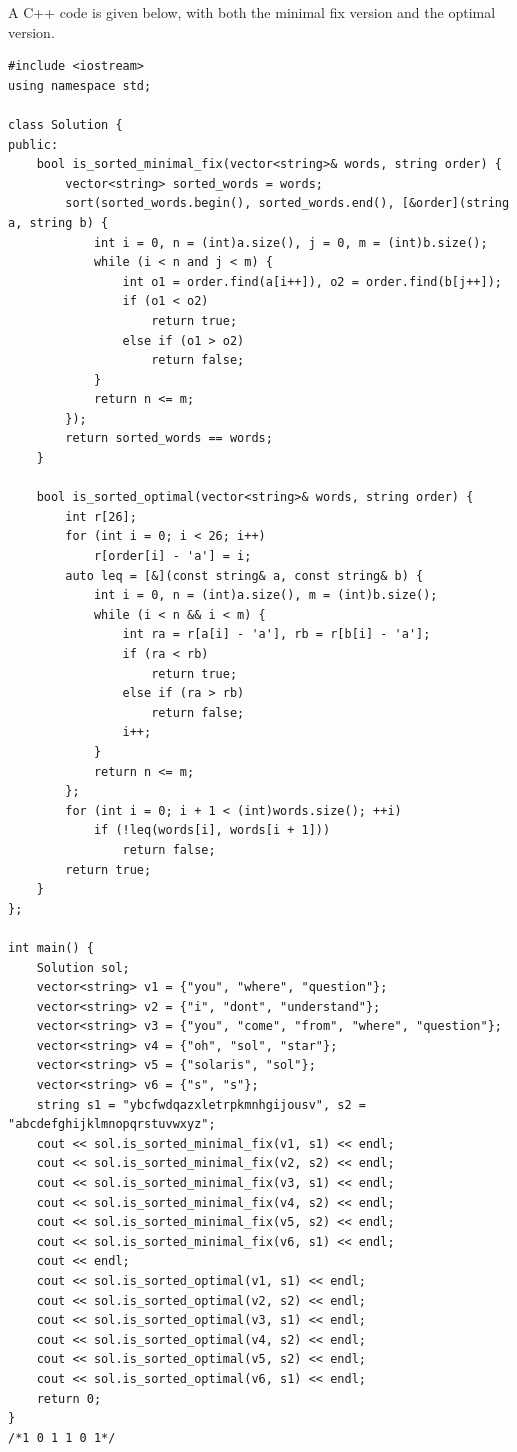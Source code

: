 \documentclass[12pt]{article}
\begin{document}
A C++ code is given below, with both the minimal fix version and the optimal version.
\begin{verbatim}
#include <iostream>
using namespace std;

class Solution {
public:
    bool is_sorted_minimal_fix(vector<string>& words, string order) {
        vector<string> sorted_words = words;
        sort(sorted_words.begin(), sorted_words.end(), [&order](string a, string b) {
            int i = 0, n = (int)a.size(), j = 0, m = (int)b.size();
            while (i < n and j < m) {
                int o1 = order.find(a[i++]), o2 = order.find(b[j++]);
                if (o1 < o2)
                    return true;
                else if (o1 > o2)
                    return false;
            }
            return n <= m;
        });
        return sorted_words == words;
    }

    bool is_sorted_optimal(vector<string>& words, string order) {
        int r[26];
        for (int i = 0; i < 26; i++)
            r[order[i] - 'a'] = i;
        auto leq = [&](const string& a, const string& b) {
            int i = 0, n = (int)a.size(), m = (int)b.size();
            while (i < n && i < m) {
                int ra = r[a[i] - 'a'], rb = r[b[i] - 'a'];
                if (ra < rb)
                    return true;
                else if (ra > rb)
                    return false;
                i++;
            }
            return n <= m;
        };
        for (int i = 0; i + 1 < (int)words.size(); ++i)
            if (!leq(words[i], words[i + 1]))
                return false;
        return true;
    }
};

int main() {
    Solution sol;
    vector<string> v1 = {"you", "where", "question"};
    vector<string> v2 = {"i", "dont", "understand"};
    vector<string> v3 = {"you", "come", "from", "where", "question"};
    vector<string> v4 = {"oh", "sol", "star"};
    vector<string> v5 = {"solaris", "sol"};
    vector<string> v6 = {"s", "s"};
    string s1 = "ybcfwdqazxletrpkmnhgijousv", s2 = "abcdefghijklmnopqrstuvwxyz";
    cout << sol.is_sorted_minimal_fix(v1, s1) << endl;
    cout << sol.is_sorted_minimal_fix(v2, s2) << endl;
    cout << sol.is_sorted_minimal_fix(v3, s1) << endl;
    cout << sol.is_sorted_minimal_fix(v4, s2) << endl;
    cout << sol.is_sorted_minimal_fix(v5, s2) << endl;
    cout << sol.is_sorted_minimal_fix(v6, s1) << endl;
    cout << endl;
    cout << sol.is_sorted_optimal(v1, s1) << endl;
    cout << sol.is_sorted_optimal(v2, s2) << endl;
    cout << sol.is_sorted_optimal(v3, s1) << endl;
    cout << sol.is_sorted_optimal(v4, s2) << endl;
    cout << sol.is_sorted_optimal(v5, s2) << endl;
    cout << sol.is_sorted_optimal(v6, s1) << endl;
    return 0;
}
/*1 0 1 1 0 1*/
\end{verbatim}
\end{document}

